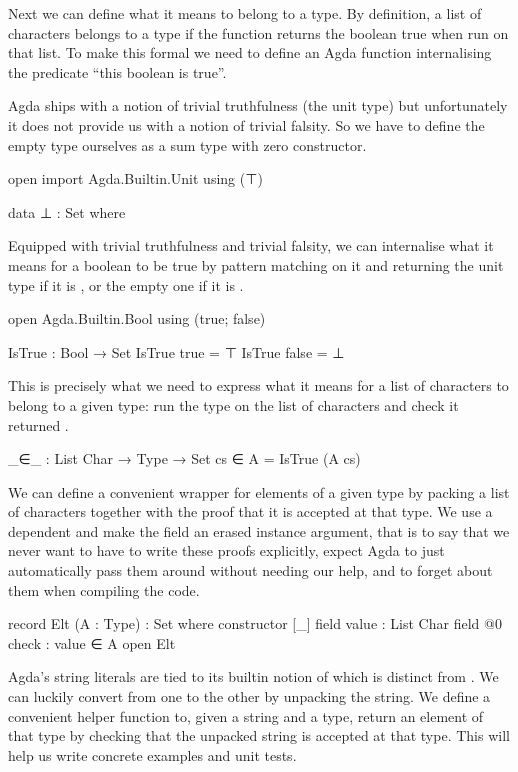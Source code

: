 \documentclass[twocolumn]{article}
\begin{document}
Next we can define what it means to belong to a type. By definition, a
list of characters belongs to a type if the function returns the boolean
true when run on that list. To make this formal we need to define an Agda
function internalising the predicate ``this boolean is true''.

Agda ships with a notion of trivial truthfulness (the unit type) but
unfortunately it does not provide us with a notion of trivial falsity.
So we have to define the empty type ourselves as a sum type with zero
constructor.

\begin{code}
open import Agda.Builtin.Unit using (⊤)

data ⊥ : Set where
\end{code}

Equipped with trivial truthfulness and trivial falsity, we can internalise
what it means for a boolean to be true by pattern matching on it and
returning the unit type if it is , or the empty one if it is
.

\begin{code}
open Agda.Builtin.Bool using (true; false)

IsTrue : Bool → Set
IsTrue true   = ⊤
IsTrue false  = ⊥
\end{code}

This is precisely what we need to express what it means for a list of
characters to belong to a given type: run the type on the
list of characters and check it returned .

\begin{code}
_∈_ : List Char → Type → Set
cs ∈ A = IsTrue (A cs)
\end{code}

We can define a convenient wrapper for elements of a given type by packing
a list of characters together with the proof that it is accepted at that
type. We use a dependent  and
%
make the  field an erased instance argument, that is to say
that we never want to have to write these proofs explicitly, expect
Agda to just automatically pass them around without needing our help,
and to forget about them when compiling the code.

\begin{code}
record Elt (A : Type) : Set where
  constructor [_]
  field     value     : List Char
  field @0  {{check}} : value ∈ A
open Elt
\end{code}

Agda's string literals are tied to its builtin notion of  which
is distinct from . We can luckily convert from one to the
other by unpacking the string. We define a convenient helper function to,
given a string and a type, return an element of that type by checking that
the unpacked string is accepted at that type. This will help us write
concrete examples and unit tests.
\end{document}
